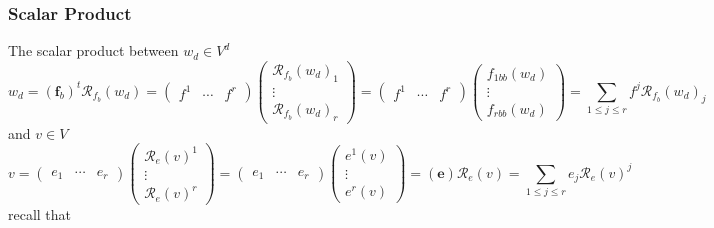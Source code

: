 \documentclass[aps,preprint]{revtex4}
\begin{document}
\subsubsection{Scalar Product \label{Scalar Product 2}}

The scalar product between $w_{d}\in V^{d}$ 
\begin{equation}
w_{d}=\left( \boldsymbol{f}_{b}\right) ^{t}\mathcal{R}_{f_{b}}\left(
w_{d}\right) =\left( 
\begin{array}{ccc}
f^{1} & \cdots & f^{r}%
\end{array}%
\right) \left( 
\begin{array}{c}
\mathcal{R}_{f_{b}}\left( w_{d}\right) _{1} \\ 
\vdots \\ 
\mathcal{R}_{f_{b}}\left( w_{d}\right) _{r}%
\end{array}%
\right) =\left( 
\begin{array}{ccc}
f^{1} & \cdots & f^{r}%
\end{array}%
\right) \left( 
\begin{array}{c}
f_{1bb}\left( w_{d}\right) \\ 
\vdots \\ 
f_{rbb}\left( w_{d}\right)%
\end{array}%
\right) =\sum_{1\leq j\leq r}f^{j}\mathcal{R}_{f_{b}}\left( w_{d}\right) _{j}
\end{equation}%
and $v\in V$ 
\begin{equation}
v=\left( 
\begin{array}{ccc}
e_{1} & \cdots & e_{r}%
\end{array}%
\right) \left( 
\begin{array}{c}
\mathcal{R}_{e}\left( v\right) ^{1} \\ 
\vdots \\ 
\mathcal{R}_{e}\left( v\right) ^{r}%
\end{array}%
\right) =\left( 
\begin{array}{ccc}
e_{1} & \cdots & e_{r}%
\end{array}%
\right) \left( 
\begin{array}{c}
e^{1}\left( v\right) \\ 
\vdots \\ 
e^{r}\left( v\right)%
\end{array}%
\right) =\left( \boldsymbol{e}\right) \mathcal{R}_{e}\left( v\right)
=\sum_{1\leq j\leq r}e_{j}\mathcal{R}_{e}\left( v\right) ^{j}
\end{equation}%
recall that 
\end{document}
